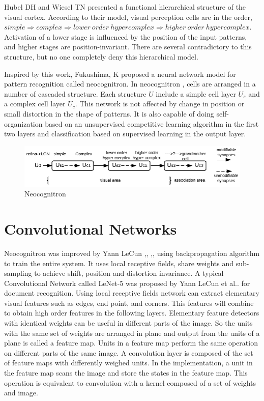 \documentclass{article}
\begin{document}
\par Hubel DH and Wiesel TN \cite{Hubel1965a} presented a functional hierarchical structure of the visual cortex. According to their model, visual perception cells are in the  order, $simple\Longrightarrow complex\Longrightarrow lower \ order  \ hypercomplex  \Longrightarrow higher \ order \ hypercomplex$. Activation of  a lower stage is  influenced by  the position of the input patterns, and  higher stages are  position-invariant. There are several  contradictory to this structure, but no one   completely deny this hierarchical model.
\par Inspired by this work, Fukushima, K \cite{Stark1980} proposed a neural network model for pattern recognition called neocognitron.
In neocognitron , cells are arranged in  a number of  cascaded structure. Each  structure $U$ include a  simple cell layer $U_s$ and a complex cell layer $U_c$. This network is not affected by change in position or small distortion in the shape of patterns.  It is also capable of doing self-organization based on an unsupervised competitive learning algorithm\cite{Fukushima1982} in the first two layers and classification based on  supervised learning in the output layer.
\begin{figure}[ht]
 \includegraphics[]{Figures/neocognitron.eps}
\caption{Neocognitron\cite{Stark1980}}
\label{neo}
\end{figure}
\section{Convolutional Networks}
\par Neocognitron was improved by  Yann LeCun \cite{lecun-86},\cite{lecun-89d}, \cite{lecun-89e},\cite{lecun-90c}, \cite{lecun-90e} using backpropagation algorithm\cite{BRYSON1963} to train the entire system.
It uses  local receptive fields, share weights and  sub-sampling to achieve  shift, position and distortion invariance. A typical Convolutional Network called  LeNet-5 was proposed by   Yann LeCun et al..\cite{LeCun1998}  for document recognition. Using local receptive fields network can extract elementary visual features such as edges, end point, and corners. This features will combine to obtain high order features in the following layers.  Elementary feature detectors with identical weights can be useful in different parts of the image. So the units with  the same set of weights are arranged in plane and output from  the units of a plane is called  a feature map. Units in  a feature map perform the same operation on different parts of the same image. A convolution layer is composed of the set of feature maps with differently weighed units. In the implementation, a unit in the feature map scans the image and store the states in the feature map. This operation is equivalent to convolution with a kernel composed of a  set of weights and image. 
\end{document}
